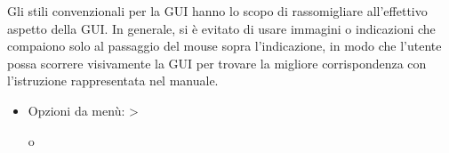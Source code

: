 
Gli stili convenzionali per la GUI hanno lo scopo di rassomigliare
all'effettivo aspetto della GUI. In generale, si è evitato di usare
immagini o indicazioni che compaiono solo al passaggio del mouse
sopra l'indicazione, in modo che l'utente possa scorrere visivamente la GUI
per trovare la migliore corrispondenza con l'istruzione rappresentata nel manuale.

\begin{itemize}
%
\item Opzioni da menù:  > %
%

o


\end{itemize}
